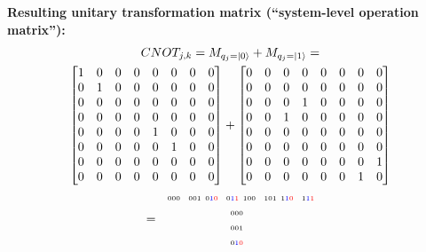 \documentclass[conference]{IEEEtran}
\begin{document}
\begin{appendices}
\textbf{Resulting unitary transformation matrix (``system-level operation matrix''):}
\begin{multline*}
    CNOT_{j,k} = M_{q_{j}=\ket{0}} + M_{q_{j}=\ket{1}}
    = \\
    \begin{bmatrix}
        1 & 0 & 0 & 0 & 0 & 0 & 0 & 0 \\
        0 & 1 & 0 & 0 & 0 & 0 & 0 & 0 \\
        0 & 0 & 0 & 0 & 0 & 0 & 0 & 0 \\
        0 & 0 & 0 & 0 & 0 & 0 & 0 & 0 \\
        0 & 0 & 0 & 0 & 1 & 0 & 0 & 0 \\
        0 & 0 & 0 & 0 & 0 & 1 & 0 & 0 \\
        0 & 0 & 0 & 0 & 0 & 0 & 0 & 0 \\
        0 & 0 & 0 & 0 & 0 & 0 & 0 & 0 \\
    \end{bmatrix}
    +
    \begin{bmatrix}
        0 & 0 & 0 & 0 & 0 & 0 & 0 & 0 \\
        0 & 0 & 0 & 0 & 0 & 0 & 0 & 0 \\
        0 & 0 & 0 & 1 & 0 & 0 & 0 & 0 \\
        0 & 0 & 1 & 0 & 0 & 0 & 0 & 0 \\
        0 & 0 & 0 & 0 & 0 & 0 & 0 & 0 \\
        0 & 0 & 0 & 0 & 0 & 0 & 0 & 0 \\
        0 & 0 & 0 & 0 & 0 & 0 & 0 & 1 \\
        0 & 0 & 0 & 0 & 0 & 0 & 1 & 0 \\
    \end{bmatrix} \\
    =
    \begin{matrix}
        \ \ {\scriptscriptstyle 000}
        \ \ {\scriptscriptstyle 001}
        \ {\scriptscriptstyle 0\textcolor{blue}{1}\textcolor{red}{0}}
        \ \ {\scriptscriptstyle 0\textcolor{blue}{1}\textcolor{red}{1}}
        \ {\scriptscriptstyle 100}
        \ \ {\scriptscriptstyle 101}
        \ {\scriptscriptstyle 1\textcolor{blue}{1}\textcolor{red}{0}}
        \ \ {\scriptscriptstyle 1\textcolor{blue}{1}\textcolor{red}{1}}
        \\
        \begin{matrix}
            {\scriptscriptstyle 000} \\
            {\scriptscriptstyle 001} \\
            {\scriptscriptstyle 0\textcolor{blue}{1}\textcolor{red}{0}} \\

\end{matrix}
\end{matrix}
\end{multline*}
\end{appendices}
\end{document}
